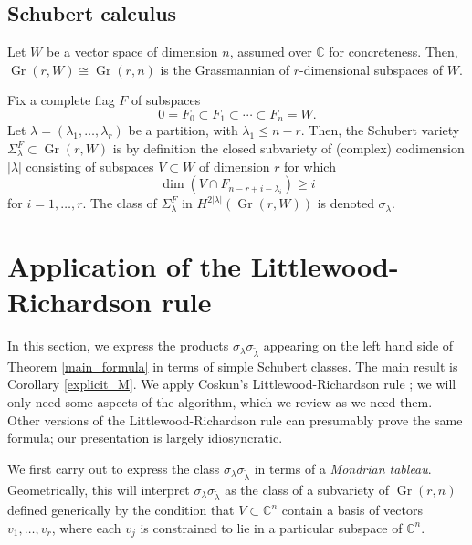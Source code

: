 \documentclass[11pt]{article}
\theoremstyle{definition}
\numberwithin{equation}{section}
\newcommand{\bC}{\mathbb{C}}
\DeclareMathOperator{\Gr}{Gr}
\begin{document}
\subsection{Schubert calculus}\label{schubert_sec}

Let $W$ be a vector space of dimension $n$, assumed over $\bC$ for concreteness. Then, $\Gr(r,W)\cong\Gr(r,n)$ is the Grassmannian of $r$-dimensional subspaces of $W$.

Fix a complete flag $F$ of subspaces
\begin{equation*}
0=F_0\subset F_1\subset\cdots \subset F_{n}=W.
\end{equation*}
Let $\lambda=(\lambda_1,\ldots,\lambda_r)$ be a partition, with $\lambda_1\le n-r$. Then, the Schubert variety $\Sigma^F_{\lambda}\subset\Gr(r,W)$ is by definition the closed subvariety of (complex) codimension $|\lambda|$ consisting of subspaces $V\subset W$ of dimension $r$ for which
\begin{equation*}
\dim(V\cap F_{n-r+i-\lambda_{i}})\ge i
\end{equation*}
for $i=1,\ldots,r$. The class of $\Sigma^F_{\lambda}$ in $H^{2|\lambda|}(\Gr(r,W))$ is denoted $\sigma_\lambda$.

\section{Application of the Littlewood-Richardson rule}\label{LR_sec}

In this section, we express the products $\sigma_{\lambda}\sigma_{\widetilde{\lambda}}$ appearing on the left hand side of Theorem \ref{main_formula} in terms of simple Schubert classes. The main result is Corollary \ref{explicit_M}. We apply Coskun's Littlewood-Richardson rule \cite{Cos09}; we will only need some aspects of the algorithm, which we review as we need them. Other versions of the Littlewood-Richardson rule can presumably prove the same formula; our presentation is largely idiosyncratic.

We first carry out \cite[Algorithm 3.19]{Cos09} to express the class $\sigma_{\lambda}\sigma_{\widetilde{\lambda}}$ in terms of a \emph{Mondrian tableau}. Geometrically, this will interpret $\sigma_{\lambda}\sigma_{\widetilde{\lambda}}$ as the class of a subvariety of $\Gr(r,n)$ defined generically by the condition that $V\subset\bC^n$ contain a basis of vectors $v_1,\ldots,v_r$, where each $v_j$ is constrained to lie in a particular subspace of $\bC^n$.
\end{document}
